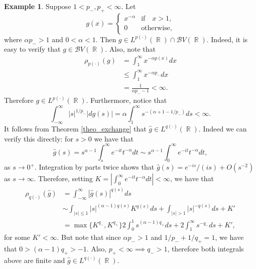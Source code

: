 \documentclass[11pt,reqno]{amsart}
\theoremstyle{definition}
\newtheorem{example}[theorem]{Example}
\theoremstyle{definition}
\theoremstyle{definition}
\DeclareMathOperator{\R}{\mathbb{R}}
\newcommand{\p}{p(\cdot)}
\newcommand{\q}{q(\cdot)}
\newcommand{\Lp}{L^{\p}(\R)}
\newcommand{\BV}{\mathcal{B}V}
\begin{document}
\begin{example}
    Suppose $1<p_{-},p_{+}<\infty$. Let 
    \begin{equation*}
        g(x)=\begin{cases}
            x^{-\alpha}&\text{if}\quad x>1,\\
            0&\text{otherwise,}
        \end{cases}
    \end{equation*}
    where $\alpha p_{-}>1$ and $0<\alpha<1$. Then $g\in \Lp\cap \BV(\R)$. Indeed, it is easy to verify that $g\in \BV(\R)$. Also, note that
    \begin{align*}
        \rho_{\p}(g)&= \int_1^\infty x^{-\alpha p(x)}dx\\
        &\leq \int_1^\infty x^{-\alpha p_{-}}dx\\
        &=\frac{1}{\alpha p_{-}-1}<\infty.
    \end{align*}
    Therefore $g\in\Lp$. Furthermore, notice that
    \begin{equation*}
        \int_{-\infty}^\infty |s|^{1/p_{-}}|dg(s)|=\alpha\int_1^{\infty}s^{-(\alpha+1-1/p_{-})}ds<\infty.
    \end{equation*}
   It follows from Theorem \ref{theo_exchange} that $\widehat{g}\in L^{q(\cdot)}(\R)$. Indeed we can verify this directly: for $s>0$ we have that
    \begin{equation*}
        \widehat{g}(s)=s^{\alpha-1}\int_s^\infty e^{-it}t^{-\alpha}dt\sim s^{\alpha-1}\int_0^\infty e^{-it}t^{-\alpha}dt,
    \end{equation*}
     as $s\to 0^+$. Integration by parts twice shows that $\widehat{g}(s)=e^{-is}/(is)+O(s^{-2})$ as $s\to \infty$.
    Therefore, setting $K=\left|\int_0^\infty e^{-it}t^{-\alpha}dt\right|<\infty$, we have that
    \begin{align*}
        \rho_{\q}(\widehat{g})&=\int_{-\infty}^\infty|\widehat{g}(s)|^{q(s)}ds\\
        &\sim \int_{|s|\leq1}|s|^{(\alpha-1)q(s)}K^{q(s)}ds+\int_{|s|>1}|s|^{-q(s)}ds+K'\\
        &=\max\{K^{q_{-}},K^{q_{+}}\}2\int_0^1 s^{(\alpha-1)q_{+}}ds+2\int_1^\infty s^{-q_{-}}ds+K',
    \end{align*}
    for some $K'<\infty$. But note that since $\alpha p_{-}>1$ and $1/p_{-}+1/q_{+}=1$, we have that $0>(\alpha-1)q_{+}>-1$. Also, $p_{+}<\infty\implies q_{-}>1$, therefore both integrals above are finite and $\widehat{g}\in L^{\q}(\R)$. 
\end{example}
\end{document}

